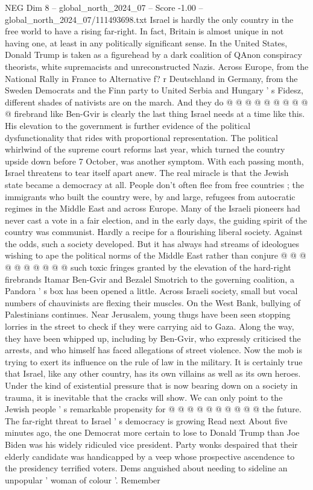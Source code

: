 \begin{textsample}{NEG Dim 8 – global\_north\_2024\_07 – Score -1.00 – global\_north\_2024\_07/111493698.txt}
Israel is hardly the only country in the free world to have a rising far-right.
In fact, Britain is almost unique in not having one, at least in any politically significant sense.
In the United States, Donald Trump is taken as a figurehead by a dark coalition of QAnon conspiracy theorists, white supremacists and unreconstructed Nazis.
Across Europe, from the National Rally in France to Alternative f? r Deutschland in Germany, from the Sweden Democrats and the Finn party to United Serbia and Hungary ' s Fidesz, different shades of nativists are on the march.
And they do @ @ @ @ @ @ @ @ @ @ firebrand like Ben-Gvir is clearly the last thing Israel needs at a time like this.
His elevation to the government is further evidence of the political dysfunctionality that rides with proportional representation.
The political whirlwind of the supreme court reforms last year, which turned the country upside down before 7 October, was another symptom.
With each passing month, Israel threatens to tear itself apart anew.
The real miracle is that the Jewish state became a democracy at all.
People don't often flee from free countries ; the immigrants who built the country were, by and large, refugees from autocratic regimes in the Middle East and across Europe.
Many of the Israeli pioneers had never cast a vote in a fair election, and in the early days, the guiding spirit of the country was communist.
Hardly a recipe for a flourishing liberal society.
Against the odds, such a society developed.
But it has always had streams of ideologues wishing to ape the political norms of the Middle East rather than conjure @ @ @ @ @ @ @ @ @ @ such toxic fringes granted by the elevation of the hard-right firebrands Itamar Ben-Gvir and Bezalel Smotrich to the governing coalition, a Pandora ' s box has been opened a little.
Across Israeli society, small but vocal numbers of chauvinists are flexing their muscles.
On the West Bank, bullying of Palestinians continues.
Near Jerusalem, young thugs have been seen stopping lorries in the street to check if they were carrying aid to Gaza.
Along the way, they have been whipped up, including by Ben-Gvir, who expressly criticised the arrests, and who himself has faced allegations of street violence.
Now the mob is trying to exert its influence on the rule of law in the military.
It is certainly true that Israel, like any other country, has its own villains as well as its own heroes.
Under the kind of existential pressure that is now bearing down on a society in trauma, it is inevitable that the cracks will show.
We can only point to the Jewish people ' s remarkable propensity for @ @ @ @ @ @ @ @ @ @ the future.
The far-right threat to Israel ' s democracy is growing Read next About five minutes ago, the one Democrat more certain to lose to Donald Trump than Joe Biden was his widely ridiculed vice president.
Party wonks despaired that their elderly candidate was handicapped by a veep whose prospective ascendence to the presidency terrified voters.
Dems anguished about needing to sideline an unpopular ' woman of colour '.
Remember

\end{textsample}
